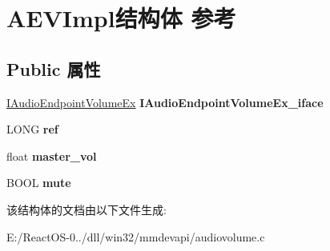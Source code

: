 \hypertarget{struct_a_e_v_impl}{}\section{A\+E\+V\+Impl结构体 参考}
\label{struct_a_e_v_impl}
\subsection*{Public 属性}
\begin{DoxyCompactItemize}
\item 
\mbox{\label{struct_a_e_v_impl_a5527849ba4ab4aad54de0c4fc4baac2b}} 
\hyperlink{interface_i_audio_endpoint_volume_ex}{I\+Audio\+Endpoint\+Volume\+Ex} {\bfseries I\+Audio\+Endpoint\+Volume\+Ex\+\_\+iface}
\item 
\mbox{\label{struct_a_e_v_impl_a104dbfadcc7113bcb49ddb8c60dbc8a9}} 
L\+O\+NG {\bfseries ref}
\item 
\mbox{\label{struct_a_e_v_impl_a980f9e8becbf337ee60acc38598f2a15}} 
float {\bfseries master\+\_\+vol}
\item 
\mbox{\label{struct_a_e_v_impl_a8677f51eb4980fae9d376edc1f0d7bc9}} 
B\+O\+OL {\bfseries mute}
\end{DoxyCompactItemize}


该结构体的文档由以下文件生成\+:\begin{DoxyCompactItemize}
\item 
E\+:/\+React\+O\+S-\/0../dll/win32/mmdevapi/audiovolume.\+c\end{DoxyCompactItemize}
